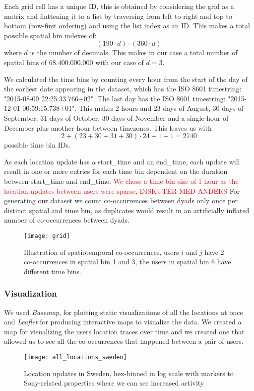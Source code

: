Each grid cell has a unique ID, this is obtained by considering the grid as a matrix and flattening it to a list by traversing from left to right and top to bottom (row-first ordering) and using the list index as an ID. This makes a total possible spatial bin indexes of: $$(190 \cdot d)\cdot(360\cdot d)$$ where $d$ is the number of decimals. This makes in our case a total number of spatial bins of $68.400.000.000$ with our case of $d=3$.

We calculated the time bins by counting every hour from the start of the day of the earliest date appearing in the dataset, which has the ISO 8601 timestring: "2015-08-09 22:25:33.766+02". The last day has the ISO 8601 timestring: "2015-12-01 00:59:15.738+01".
This makes 2 hours and 23 days of August, 30 days of September, 31 days of October, 30 days of November and a single hour of December plus another hour between timezones. This leaves us with $$2+(23+30+31+30)\cdot24+1+1=2740$$ possible time bin IDs.

As each location update has a start\_time and an end\_time, each update will result in one or more entries for each time bin dependent on the duration between start\_time and end\_time. \textcolor{red}{We chose a time bin size of 1 hour as the location updates between users were sparse, DISKUTER MED ANDERS}  For generating our dataset we count co-occurrences between dyads only once per distinct spatial and time bin, as duplicates would result in an artificially inflated number of co-occurrences between dyads.
\begin{figure}[H]
    \hspace*{-1.0cm}
    \centering
    \texttt{[image: grid]}
    \caption{Illustration of spatiotemporal co-occurrences, users $i$ and $j$ have 2 co-occurrences in spatial bin 1 and 3, the users in spatial bin 6 have different time bins.}
    \label{fig:binning}
\end{figure}

\subsubsection{Visualization}
We used \textit{Basemap}\cite{basemap}, for plotting static visualizations of all the locations at once and \textit{Leaflet}\cite{leaflet} for producing interactive maps to visualize the data. We created a map for visualizing the users location traces over time and we created one that allowed us to see all the co-occurrences that happened between a pair of users.
\begin{figure}[H]
    \hspace*{-1.0cm}
    \centering
    \texttt{[image: all\_locations\_sweden]}
    \caption{Location updates in Sweden, hex-binned in log scale with markers to Sony-related properties where we can see increased activity}
    \label{fig:sweden_locations_hexbin}
\end{figure}

